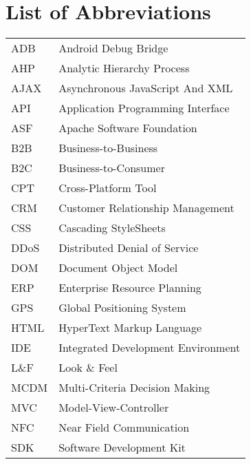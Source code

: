\documentclass[master=cws,masteroption=se,english,a4paper]{kulemt}
\begin{document}
\chapter{List of Abbreviations}
\begin{flushleft}
  \renewcommand{\arraystretch}{1.1}
  \begin{tabularx}{\textwidth}{@{}p{12mm}X@{}}
    ADB & Android Debug Bridge \\
    AHP & Analytic Hierarchy Process \\
    AJAX & Asynchronous JavaScript And XML \\
    API & Application Programming Interface \\
    ASF & Apache Software Foundation \\
    B2B & Business-to-Business \\
    B2C & Business-to-Consumer \\
    CPT   & Cross-Platform Tool \\
    CRM & Customer Relationship Management \\
    CSS & Cascading StyleSheets \\
    DDoS & Distributed Denial of Service \\
    DOM & Document Object Model \\
    ERP & Enterprise Resource Planning \\
    GPS & Global Positioning System \\
    HTML & HyperText Markup Language \\
    IDE & Integrated Development Environment \\
    L\&F & Look \& Feel \\
    MCDM & Multi-Criteria Decision Making \\
    MVC & Model-View-Controller \\
    NFC & Near Field Communication \\
    SDK & Software Development Kit
  \end{tabularx}
\end{flushleft}

\mainmatter







%
%
%

\appendixpage*

\appendix
\end{document}
